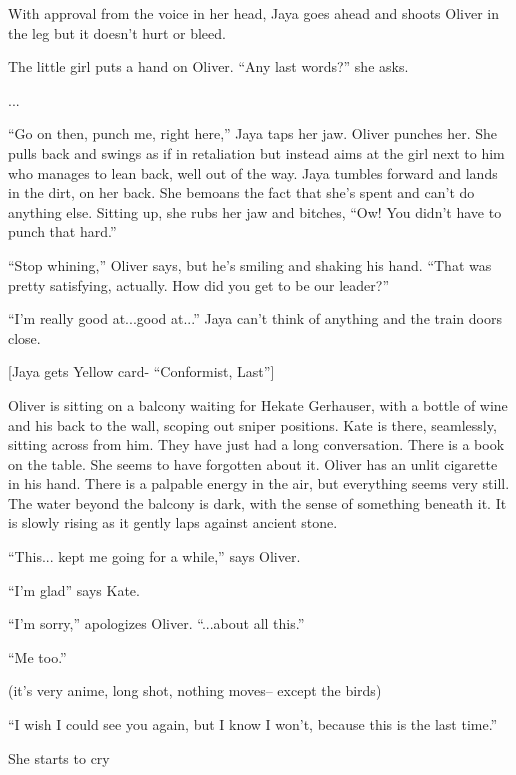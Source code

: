 With approval from the voice in her head, Jaya goes ahead and shoots Oliver in the leg but it doesn't hurt or bleed.



The little girl puts a hand on Oliver.  ``Any last words?'' she asks.

...

``Go on then, punch me, right here,'' Jaya taps her jaw.  Oliver punches her.   She pulls back and swings as if in retaliation but instead aims at the girl next to him who manages to lean back, well out of the way.  Jaya tumbles forward and lands in the dirt, on her back.   She bemoans the fact that she's spent and can't do anything else.  Sitting up, she rubs her jaw and bitches, ``Ow!  You didn't have to punch that hard.'' 

``Stop whining,'' Oliver says, but he's smiling and shaking his hand.  ``That was pretty satisfying, actually.  How did you get to be our leader?''

``I'm really good at...good at...'' Jaya can't think of anything and the train doors close.



{[}Jaya gets Yellow card- ``Conformist, Last''{]}




Oliver is sitting on a balcony waiting for Hekate Gerhauser, with a bottle of wine and his back to the wall, scoping out sniper positions. Kate is there, seamlessly, sitting across from him. They have just had a long conversation. There is a book on the table. She seems to have forgotten about it. Oliver has an unlit cigarette in his hand. There is a palpable energy in the air, but everything seems very still.  The water beyond the balcony is dark, with the sense of something beneath it. It is slowly rising as it gently laps against ancient stone.



``This... kept me going for a while,'' says Oliver.

``I'm glad'' says Kate.

``I'm sorry,'' apologizes Oliver.  ``...about all this.''

``Me too.''

(it's very anime, long shot, nothing moves-- except the birds)

``I wish I could see you again, but I know I won't, because this is the last time.''

She starts to cry

